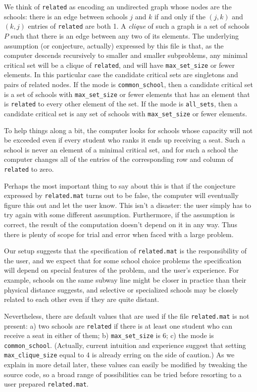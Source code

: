\documentclass[12pt]{article}
\theoremstyle{definition}
\begin{document}
We think of \texttt{related} as encoding an undirected graph whose
nodes are the schools: there is an edge between schools $j$ and $k$ if
and only if the $(j,k)$ and $(k,j)$ entries of \texttt{related} are
both 1. A \emph{clique} of such a graph is a set of schools $P$ such
that there is an edge between any two of its elements.  The underlying
assumption (or conjecture, actually) expressed by this file is that,
as the computer descends recursively to smaller and smaller
subproblems, any minimal critical set will be a clique of
\texttt{related}, and will have \texttt{max\_set\_size} or fewer
elements.  In this particular case the candidate critical sets are
singletons and pairs of related nodes.  If the mode is
\texttt{common\_school}, then a candidate critical set is a set of
schools with \texttt{max\_set\_size} or fewer elements that has an
element that is \texttt{related} to every other element of the set.
If the mode is \texttt{all\_sets}, then a candidate critical set is
any set of schools with \texttt{max\_set\_size} or fewer elements.

To help things along a bit, the computer looks for schools whose
capacity will not be exceeded even if every student who ranks it ends
up receiving a seat.  Such a school is never an element of a minimal
critical set, and for such a school the computer changes all of the
entries of the corresponding row and column of \texttt{related} to
zero.

Perhaps the most important thing to say about this is that if the
conjecture expressed by \texttt{related.mat} turns out to be false,
the computer will eventually figure this out and let the user know.
This isn't a disaster: the user simply has to try again with some
different assumption.  Furthermore, if the assumption is correct, the
result of the computation doesn't depend on it in any way.  Thus there
is plenty of scope for trial and error when faced with a large
problem.

Our setup suggests that the specification of \texttt{related.mat} is
the responsibility of the user, and we expect that for some school
choice problems the specification will depend on special features of
the problem, and the user's experience.  For example, schools on the
same subway line might be closer in practice than their physical
distance suggests, and selective or specialized schools may be closely
related to each other even if they are quite distant.

Nevertheless, there are default values that are used if the file
\texttt{related.mat} is not present: a) two schools are
\texttt{related} if there is at least one student who can receive a
seat in either of them; b) \texttt{max\_set\_size} is 6; c) the mode
is \texttt{common\_school}. (Actually, current intuition and
experience suggest that setting \texttt{max\_clique\_size} equal to 4
is already erring on the side of caution.)  As we explain in more
detail later, these values can easily be modified by tweaking the
source code, so a broad range of possibilities can be tried before
resorting to a user prepared \texttt{related.mat}.
\end{document}
